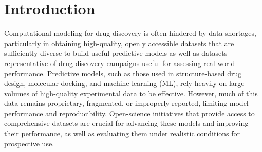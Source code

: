 \documentclass[journal=jcim,manuscript=article]{achemso}
\begin{document}
\section{Introduction}
Computational modeling for drug discovery is often hindered by data shortages, particularly in obtaining high-quality, openly accessible datasets that are sufficiently diverse to build useful predictive models as well as datasets representative of drug discovery campaigns useful for assessing real-world performance\cite{van_tilborg_deep_2024, volkamer_machine_2023}.  Predictive models, such as those used in structure-based drug design, molecular docking, and machine learning (ML), rely heavily on large volumes of high-quality experimental data to be effective. However, much of this data remains proprietary, fragmented, or improperly reported, limiting model performance and reproducibility\cite{baker_1500_2016, ash_practically_2024, kapoor_leakage_2023, wognum_call_2024, volkamer_machine_2023}. Open-science initiatives that provide access to comprehensive datasets are crucial for advancing these models and improving their performance, as well as evaluating them under realistic conditions for prospective use.
\end{document}
